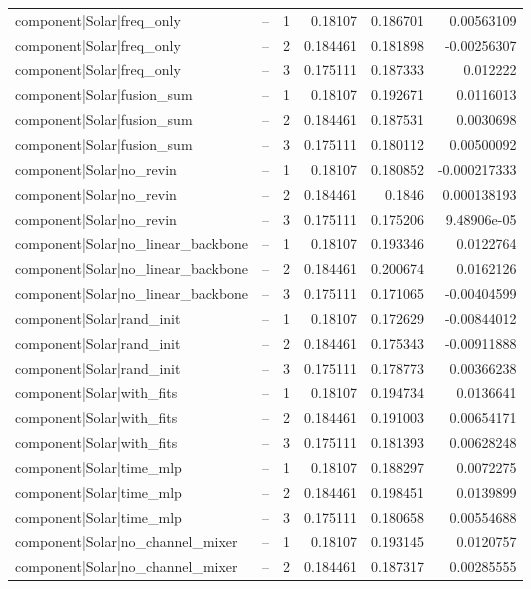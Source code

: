 \begin{longtable}{llrrrr}
component|Solar|freq\_only & -- & 1 & 0.18107 & 0.186701 & 0.00563109 \\
component|Solar|freq\_only & -- & 2 & 0.184461 & 0.181898 & -0.00256307 \\
component|Solar|freq\_only & -- & 3 & 0.175111 & 0.187333 & 0.012222 \\
component|Solar|fusion\_sum & -- & 1 & 0.18107 & 0.192671 & 0.0116013 \\
component|Solar|fusion\_sum & -- & 2 & 0.184461 & 0.187531 & 0.0030698 \\
component|Solar|fusion\_sum & -- & 3 & 0.175111 & 0.180112 & 0.00500092 \\
component|Solar|no\_revin & -- & 1 & 0.18107 & 0.180852 & -0.000217333 \\
component|Solar|no\_revin & -- & 2 & 0.184461 & 0.1846 & 0.000138193 \\
component|Solar|no\_revin & -- & 3 & 0.175111 & 0.175206 & 9.48906e-05 \\
component|Solar|no\_linear\_backbone & -- & 1 & 0.18107 & 0.193346 & 0.0122764 \\
component|Solar|no\_linear\_backbone & -- & 2 & 0.184461 & 0.200674 & 0.0162126 \\
component|Solar|no\_linear\_backbone & -- & 3 & 0.175111 & 0.171065 & -0.00404599 \\
component|Solar|rand\_init & -- & 1 & 0.18107 & 0.172629 & -0.00844012 \\
component|Solar|rand\_init & -- & 2 & 0.184461 & 0.175343 & -0.00911888 \\
component|Solar|rand\_init & -- & 3 & 0.175111 & 0.178773 & 0.00366238 \\
component|Solar|with\_fits & -- & 1 & 0.18107 & 0.194734 & 0.0136641 \\
component|Solar|with\_fits & -- & 2 & 0.184461 & 0.191003 & 0.00654171 \\
component|Solar|with\_fits & -- & 3 & 0.175111 & 0.181393 & 0.00628248 \\
component|Solar|time\_mlp & -- & 1 & 0.18107 & 0.188297 & 0.0072275 \\
component|Solar|time\_mlp & -- & 2 & 0.184461 & 0.198451 & 0.0139899 \\
component|Solar|time\_mlp & -- & 3 & 0.175111 & 0.180658 & 0.00554688 \\
component|Solar|no\_channel\_mixer & -- & 1 & 0.18107 & 0.193145 & 0.0120757 \\
component|Solar|no\_channel\_mixer & -- & 2 & 0.184461 & 0.187317 & 0.00285555 \\

\end{longtable}
